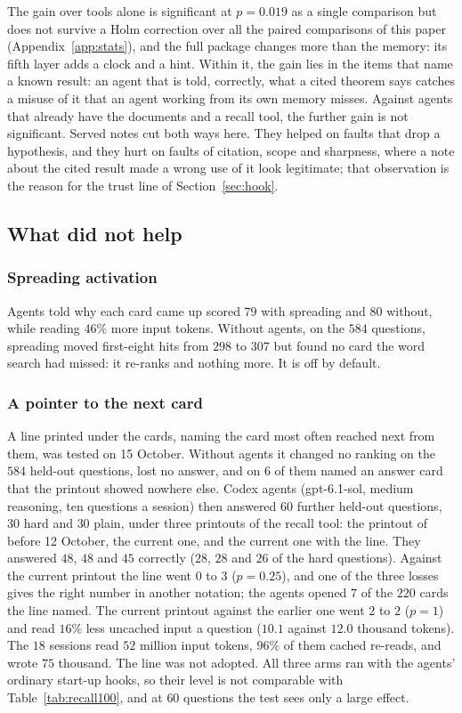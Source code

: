 The gain over tools alone is significant at $p=0.019$ as a single comparison but does not survive a Holm correction over all the paired comparisons of this paper (Appendix~\ref{app:stats}), and the full package changes more than the memory: its fifth layer adds a clock and a hint. Within it, the gain lies in the items that name a known result: an agent that is told, correctly, what a cited theorem says catches a misuse of it that an agent working from its own memory misses. Against agents that already have the documents and a recall tool, the further gain is not significant. Served notes cut both ways here. They helped on faults that drop a hypothesis, and they hurt on faults of citation, scope and sharpness, where a note about the cited result made a wrong use of it look legitimate; that observation is the reason for the trust line of Section~\ref{sec:hook}.

\subsection{What did not help}

\subsubsection*{Spreading activation}
Agents told why each card came up scored $79$ with spreading and $80$ without, while reading $46\%$ more input tokens. Without agents, on the $584$ questions, spreading moved first-eight hits from $298$ to $307$ but found no card the word search had missed: it re-ranks and nothing more. It is off by default.

\subsubsection*{A pointer to the next card}
A line printed under the cards, naming the card most often reached next from them, was tested on 15 October. Without agents it changed no ranking on the $584$ held-out questions, lost no answer, and on $6$ of them named an answer card that the printout showed nowhere else. Codex agents (gpt-6.1-sol, medium reasoning, ten questions a session) then answered $60$ further held-out questions, $30$ hard and $30$ plain, under three printouts of the recall tool: the printout of before 12 October, the current one, and the current one with the line. They answered $48$, $48$ and $45$ correctly ($28$, $28$ and $26$ of the hard questions). Against the current printout the line went $0$ to $3$ ($p=0.25$), and one of the three losses gives the right number in another notation; the agents opened $7$ of the $220$ cards the line named. The current printout against the earlier one went $2$ to $2$ ($p=1$) and read $16\%$ less uncached input a question ($10.1$ against $12.0$ thousand tokens). The $18$ sessions read $52$ million input tokens, $96\%$ of them cached re-reads, and wrote $75$ thousand. The line was not adopted. All three arms ran with the agents' ordinary start-up hooks, so their level is not comparable with Table~\ref{tab:recall100}, and at $60$ questions the test sees only a large effect.


